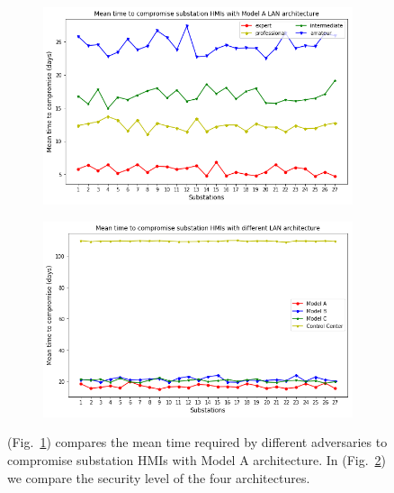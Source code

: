 \begin{figure}[htbp]
	\centering
	\begin{subfigure}{0.23\textwidth}
	\centering
	\includegraphics[width=\textwidth]{fig-resultA.png}
	\caption{}
	\label{sfig:result-A}
	\end{subfigure}
	\begin{subfigure}{0.23\textwidth}
	\centering
	\includegraphics[width=\textwidth]{figs/fig-compare-model.png}
	\caption{}
	\label{sfig:result-compare}
	\end{subfigure}
	\caption{(Fig.~\ref{sfig:result-A}) compares the mean time required by different adversaries to compromise substation HMIs with Model A architecture. In (Fig.~\ref{sfig:result-compare}) we compare the security level of the four architectures.}
	\label{fig:result-1}
\end{figure}
